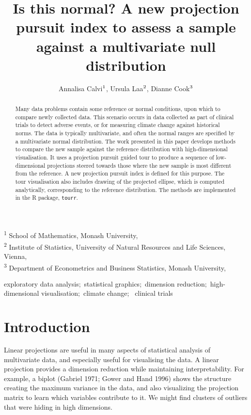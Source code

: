 \documentclass[
  12pt,
]{interact}
\title{Is this normal? A new projection pursuit index to assess a sample
against a multivariate null distribution}
\author{Annalisa Calvi$\textsuperscript{1}$, Ursula
Laa$\textsuperscript{2}$, Dianne Cook$\textsuperscript{3}$}
\begin{document}
\captionsetup{labelsep=space}
\maketitle
\textsuperscript{1} School of Mathematics, Monash
University,  \\ \textsuperscript{2} Institute of Statistics, University
of Natural Resources and Life Sciences,
Vienna,  \\ \textsuperscript{3} Department of Econometrics and Business
Statistics, Monash University,  
\begin{abstract}
Many data problems contain some reference or normal conditions, upon
which to compare newly collected data. This scenario occurs in data
collected as part of clinical trials to detect adverse events, or for
measuring climate change against historical norms. The data is typically
multivariate, and often the normal ranges are specified by a
multivariate normal distribution. The work presented in this paper
develops methods to compare the new sample against the reference
distribution with high-dimensional visualisation. It uses a projection
pursuit guided tour to produce a sequence of low-dimensional projections
steered towards those where the new sample is most different from the
reference. A new projection pursuit index is defined for this purpose.
The tour visualisation also includes drawing of the projected ellipse,
which is computed analytically, corresponding to the reference
distribution. The methods are implemented in the R package,
\texttt{tourr}.
\end{abstract}
\begin{keywords}
\def\sep{;\ }
exploratory data analysis\sep statistical graphics\sep dimension
reduction\sep high-dimensional visualisation\sep climate change\sep 
clinical trials
\end{keywords}


\section{Introduction}\label{introduction}

Linear projections are useful in many aspects of statistical analysis of
multivariate data, and especially useful for visualising the data. A
linear projection provides a dimension reduction while maintaining
interpretability. For example, a biplot (Gabriel 1971; Gower and Hand
1996) shows the structure creating the maximum variance in the data, and
also visualizing the projection matrix to learn which variables
contribute to it. We might find clusters of outliers that were hiding in
high dimensions.
\end{document}
